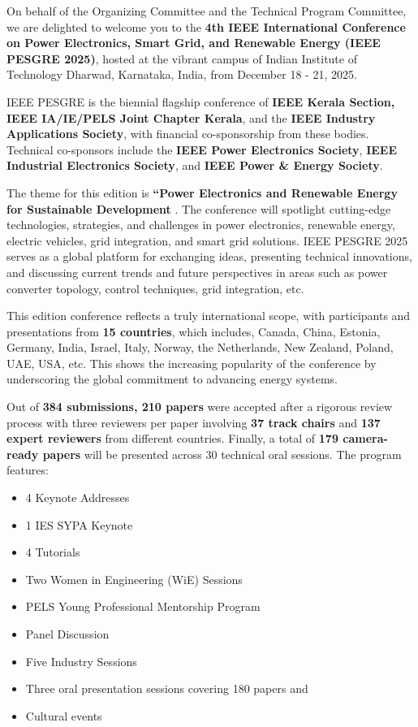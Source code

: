 On behalf of the Organizing Committee and the Technical Program Committee,
we are delighted to welcome you to the \textbf{4th IEEE International Conference on Power Electronics, Smart Grid, and Renewable Energy (IEEE PESGRE 2025)}, hosted at the vibrant campus of Indian Institute of Technology Dharwad, Karnataka, India, from December 18 - 21, 2025.

IEEE PESGRE is the biennial flagship conference of \textbf{IEEE Kerala Section, IEEE IA/IE/PELS Joint Chapter Kerala}, and the \textbf{IEEE Industry Applications Society}, with financial co-sponsorship from these bodies. Technical co-sponsors include the \textbf{IEEE Power Electronics Society}, \textbf{IEEE Industrial Electronics Society}, and \textbf{IEEE Power \& Energy Society}.

The theme for this edition is \textbf{``Power Electronics and Renewable Energy for Sustainable Development }. The conference will spotlight cutting-edge technologies, strategies, and challenges in power electronics, renewable energy, electric vehicles, grid integration, and smart grid solutions. IEEE PESGRE 2025 serves as a global platform for exchanging ideas, presenting technical innovations, and discussing current trends and future perspectives in areas such as power converter topology, control techniques, grid integration, etc.

This edition conference reflects a truly international scope, with participants and presentations from \textbf{15 countries}, which includes, Canada, China, Estonia, Germany, India, Israel, Italy, Norway, the Netherlands, New Zealand, Poland, UAE, USA, etc. This shows the increasing popularity of the conference by underscoring the global commitment to advancing energy systems.

Out of \textbf{384 submissions, 210 papers} were accepted after a rigorous review process with three reviewers per paper involving \textbf{37 track chairs} and \textbf{137 expert reviewers} from different countries.  Finally, a total of \textbf{179 camera-ready papers} will be presented across 30 technical oral sessions.
%
The program features:
%
\begin{itemize}
\setlength{\itemsep}{0pt}        %
\setlength{\parskip}{0pt}        %
\setlength{\parsep}{0pt}         %
\item 4 Keynote Addresses
\item 1 IES SYPA Keynote
\item 4 Tutorials
\item Two Women in Engineering (WiE) Sessions
\item PELS Young Professional Mentorship Program
\item Panel Discussion
\item Five Industry Sessions
\item Three oral presentation sessions covering 180 papers and 
\item Cultural events 
\end{itemize}

